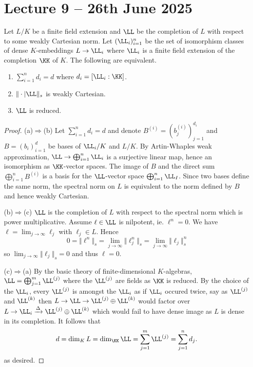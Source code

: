 \section{Lecture 9 -- 26th June 2025}\label{sec: lecture 9}
\begin{proposition}\label{prop: equivalent conditions on dense embeddings}
    Let $L/K$ be a finite field extension and $\LL$ be the completion of $L$ with respect to some weakly Cartesian norm. Let $(\LL_{i})_{i=1}^{n}$ be the set of isomorphism classes of dense $K$-embeddings $L\to\LL_{i}$ where $\LL_{i}$ is a finite field extension of the completion $\KK$ of $K$. The following are equivalent. 
    \begin{enumerate}[label=(\alph*)]
        \item $\sum_{i=1}^{n}d_{i}=d$ where $d_{i}=[\LL_{i}:\KK]$. 
        \item $\Vert\cdot|\LL\Vert_{s}$ is weakly Cartesian. 
        \item $\LL$ is reduced. 
    \end{enumerate}
\end{proposition}
\begin{proof}
    (a)$\Rightarrow$(b) Let $\sum_{i=1}^{n}d_{i}=d$ and denote $B^{(i)}=(b_{j}^{(i)})_{j=1}^{d_{i}}$ and $B=(b_{i})_{i=1}^{d}$ be bases of $\LL_{i}/K$ and $L/K$. By Artin-Whaples weak approximation, $\LL\to\bigoplus_{i=1}^{n}\LL_{i}$ is a surjective linear map, hence an isomorphism as $\KK$-vector spaces. The image of $B$ and the direct sum $\bigoplus_{i=1}^{n}B^{(i)}$ is a basis for the $\LL$-vector space $\bigoplus_{i=1}^{n}\LL_{I}$. Since two bases define the same norm, the spectral norm on $L$ is equivalent to the norm defined by $B$ and hence weakly Cartesian. 

    (b)$\Rightarrow$(c) $\LL$ is the completion of $L$ with respect to the spectral norm which is power multiplicative. Assume $\ell\in\LL$ is nilpotent, ie. $\ell^{n}=0$. We have $\ell=\lim_{j\to\infty}\ell_{j}$ with $\ell_{j}\in L$. Hence 
    $$0=\Vert\ell^{n}\Vert_{s}=\lim_{j\to\infty}\Vert \ell_{j}^{n}\Vert_{s} =\lim_{j\to\infty}\Vert\ell_{j}\Vert_{s}^{n}$$
    so $\lim_{j\to\infty}\Vert\ell_{j}\Vert_{s}=0$ and thus $\ell=0$. 

    (c)$\Rightarrow$(a) By the basic theory of finite-dimensional $K$-algebras, $\LL=\bigoplus_{j=1}^{m}\LL^{(j)}$ where the $\LL^{(j)}$ are fields as $\KK$ is reduced. By the choice of the $\LL_{i}$, every $\LL^{(j)}$ is amongst the $\LL_{i}$ as if $\LL_{i}$ occured twice, say as $\LL^{(j)}$ and $\LL^{(k)}$ then $L\to\LL\to\LL^{(j)}\oplus\LL^{(k)}$ would factor over $L\to\LL_{i}\xrightarrow{\Delta}\LL^{(j)}\oplus\LL^{(k)}$ which would fail to have dense image as $L$ is dense in its completion. It follows that 
    $$d=\dim_{K}L=\dim_{\KK}\LL=\sum_{j=1}^{m}\LL^{(j)}=\sum_{j=1}^{n}d_{j}.$$
    as desired. 
\end{proof}
